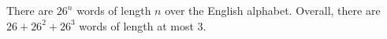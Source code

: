 There are $26^{n}$ words of length $n$ over the English alphabet.
Overall, there are $26 + 26^{2} + 26^{3}$ words of length at most $3$.